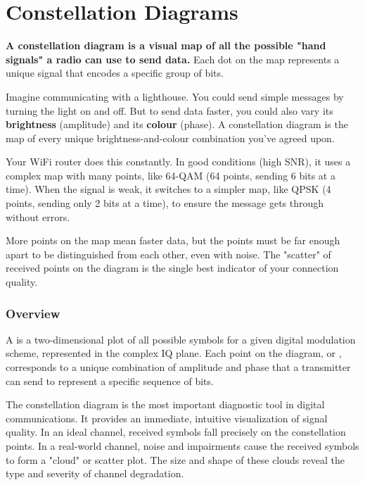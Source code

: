 
\chapter{Constellation Diagrams}
\label{ch:constellations}

\begin{nontechnical}
    \textbf{A constellation diagram is a visual map of all the possible "hand signals" a radio can use to send data.} Each dot on the map represents a unique signal that encodes a specific group of bits.

     Imagine communicating with a lighthouse. You could send simple messages by turning the light on and off. But to send data faster, you could also vary its \textbf{brightness} (amplitude) and its \textbf{colour} (phase). A constellation diagram is the map of every unique brightness-and-colour combination you've agreed upon.

     Your WiFi router does this constantly. In good conditions (high SNR), it uses a complex map with many points, like 64-QAM (64 points, sending 6 bits at a time). When the signal is weak, it switches to a simpler map, like QPSK (4 points, sending only 2 bits at a time), to ensure the message gets through without errors.

     More points on the map mean faster data, but the points must be far enough apart to be distinguished from each other, even with noise. The "scatter" of received points on the diagram is the single best indicator of your connection quality.
\end{nontechnical}


\subsection{Overview}

A  is a two-dimensional plot of all possible symbols for a given digital modulation scheme, represented in the complex IQ plane. Each point on the diagram, or , corresponds to a unique combination of amplitude and phase that a transmitter can send to represent a specific sequence of bits.

\begin{keyconcept}
    The constellation diagram is the most important diagnostic tool in digital communications. It provides an immediate, intuitive visualization of signal quality. In an ideal channel, received symbols fall precisely on the constellation points. In a real-world channel, noise and impairments cause the received symbols to form a "cloud" or scatter plot. The size and shape of these clouds reveal the type and severity of channel degradation.
\end{keyconcept}


